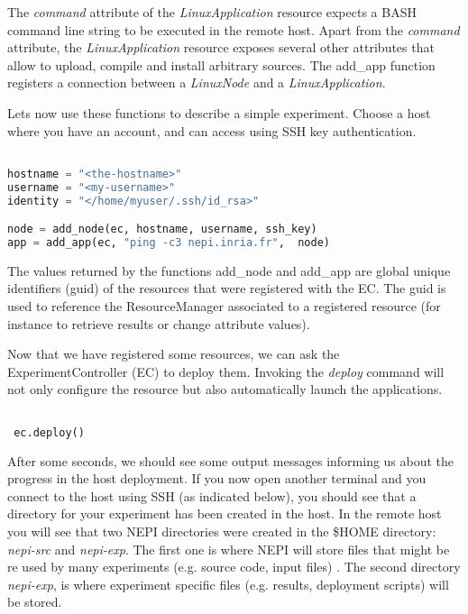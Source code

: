 The \textit{command} attribute of the \textit{LinuxApplication} resource 
expects a BASH command line string to be executed in the remote host.
Apart from the \emph{command} attribute, the \emph{LinuxApplication} 
resource exposes several other attributes that allow to upload, 
compile and install arbitrary sources. 
The add\_app function registers a connection between a \textit{LinuxNode} and a 
\textit{LinuxApplication}. 

Lets now use these functions to describe a simple experiment. 
Choose a host where you have an account, and can access using SSH
key authentication. 

\begin{lstlisting}[language=Python]

hostname = "<the-hostname>"
username = "<my-username>"
identity = "</home/myuser/.ssh/id_rsa>"

node = add_node(ec, hostname, username, ssh_key)
app = add_app(ec, "ping -c3 nepi.inria.fr",  node)

\end{lstlisting}

The values returned by the functions add\_node and add\_app are global 
unique identifiers (guid) of the resources that were registered with the EC. 
The guid is used to reference the ResourceManager associated to a registered
resource (for instance to retrieve results or change attribute values).

Now that we have registered some resources, we can ask the ExperimentController
(EC) to deploy them. 
Invoking the \emph{deploy} command will not only configure the 
resource but also automatically launch the applications.

\begin{lstlisting}[language=Python]

 ec.deploy()

\end{lstlisting}

After some seconds, we should see some output messages informing us about the
progress in the host deployment.
If you now open another terminal and you connect to the host using 
SSH (as indicated below), you should see that a directory for your experiment 
has been created in the host. In the remote host you will see that two NEPI 
directories were created in the \$HOME directory: \emph{nepi-src} and \emph{nepi-exp}. 
The first one is where NEPI will store files that might be re used by many 
experiments (e.g. source code, input files) . The second directory \emph{nepi-exp}, 
is where experiment specific files (e.g. results, deployment scripts) will be stored. 


